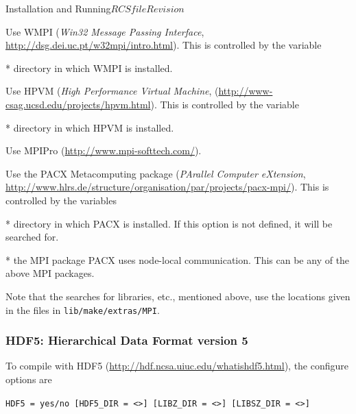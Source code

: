 \begin{cactuspart}{Installation and Running}{$RCSfile$}{$Revision$}
\begin{Lentry}
\item[\texttt{WMPI}]
Use WMPI (\textit{Win32 Message Passing Interface}, \url{http://dsg.dei.uc.pt/w32mpi/intro.html}). This is controlled by the variable
  \begin{Lentry}
  \item[\texttt{WMPI\_DIR}] * directory in which WMPI is installed.
  \end{Lentry}

\item[\texttt{HPVM}]
Use HPVM (\textit{High Performance Virtual Machine},
(\url{http://www-csag.ucsd.edu/projects/hpvm.html}).
This is controlled by the variable
  \begin{Lentry}
  \item[\texttt{HPVM\_DIR}] * directory in which HPVM is installed.
  \end{Lentry}

\item[\texttt{MPIPro}]
Use MPIPro (\url{http://www.mpi-softtech.com/}).

\item[\texttt{PACX}]
Use the PACX Metacomputing package (\textit{PArallel Computer eXtension},\\
\url{http://www.hlrs.de/structure/organisation/par/projects/pacx-mpi/}). This is controlled by the variables
  \begin{Lentry}
  \item[\texttt{PACX\_DIR}] * directory in which PACX is installed.
        If this option is not defined, it will be searched for.
  \item[\texttt{PACX\_MPI}] * the MPI package PACX uses node-local
        communication. This can be any of the above MPI packages.
  \end{Lentry}

\end{Lentry}

Note that the searches for libraries, etc., mentioned above, use the
locations given in the files in \texttt{lib/make/extras/MPI}.

\subsubsection{HDF5: Hierarchical Data Format version 5}
\label{subsec:hdf5}

To compile with HDF5 (\url{http://hdf.ncsa.uiuc.edu/whatishdf5.html}),
the configure options are

\texttt{HDF5 = yes/no [HDF5\_DIR = <>] [LIBZ\_DIR = <>] [LIBSZ\_DIR = <>]}


\end{cactuspart}
